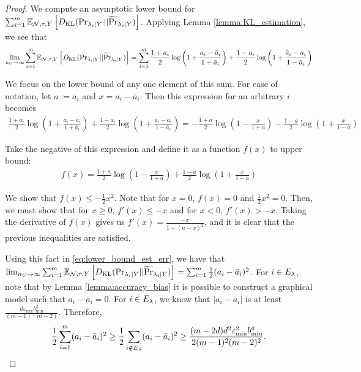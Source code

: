 \begin{proof}
We compute an asymptotic lower bound for $\sum_{i = 1}^m \mathbb{E}_{\mathcal{N}, \tau, Y}\left[D_{\mathrm{KL}}( \Pr_{\lambda_i | Y} || \widetilde{\Pr}_{\lambda_i | Y})\right]$. Applying Lemma \ref{lemma:KL_estimation}, we see that 
\begin{align}
    \lim_{n_U \rightarrow \infty} \sum_{i = 1}^m \mathbb{E}_{\mathcal{N}, \tau, Y}\left[D_{\mathrm{KL}}( \mathrm{Pr}_{\lambda_i | Y} || \widetilde{\Pr}_{\lambda_i | Y})\right] = \sum_{i = 1}^m \frac{1 + a_i}{2} \log \left(1 + \frac{a_i - \bar{a}_i}{1 + \bar{a}_i}\right) + \frac{1 - a_i}{2} \log \left(1 + \frac{\bar{a}_i - a_i}{1 - \bar{a}_i}\right) \label{eq:lower_bound_est_err}
\end{align}

We focus on the lower bound of any one element of this sum. For ease of notation, let $a := a_i$ and $x = a_i - \bar{a}_i$. Then this expression for an arbitrary $i$ becomes
\begin{align}
    \frac{1 + a_i}{2} \log \left(1 + \frac{a_i - \bar{a}_i}{1 + \bar{a}_i}\right) + \frac{1 - a_i}{2} \log \left(1 + \frac{\bar{a}_i - a_i}{1 - \bar{a}_i}\right) = - \frac{1 + a}{2} \log \left(1 - \frac{x}{1 + a}\right) - \frac{1 - a}{2} \log \left(1 + \frac{x}{1 - a}\right) 
\end{align}

Take the negative of this expression and define it as a function $f(x)$ to upper bound:
\begin{align}
    f(x) = \frac{1 + a}{2} \log \left(1 - \frac{x}{1 + a}\right) + \frac{1 - a}{2} \log \left(1 + \frac{x}{1 - a}\right)
\end{align}

We show that $f(x) \le - \frac{1}{2}x^2$. Note that for $x = 0$, $f(x) = 0$ and $\frac{1}{2}x^2 = 0$. Then, we must show that for $x \ge 0$, $f'(x) \le -x$ and for $x < 0$, $f'(x) > -x$. Taking the derivative of $f(x)$ gives us $f'(x) = \frac{-x}{1 - (a - x)^2}$, and it is clear that the previous inequalities are satisfied.

Using this fact in \eqref{eq:lower_bound_est_err}, we have that $
     \lim_{n_U \rightarrow \infty} \sum_{i = 1}^m \mathbb{E}_{\mathcal{N}, \tau, Y}\left[D_{\mathrm{KL}}( \mathrm{Pr}_{\lambda_i | Y} || \widetilde{\Pr}_{\lambda_i | Y})\right] = \sum_{i = 1}^m \frac{1}{2} (a_i - \bar{a}_i)^2
$. For $i \in E_{\lambda}$, note that by Lemma \ref{lemma:accuracy_bias} it is possible to construct a graphical model such that $a_i - \bar{a}_i = 0$. For $i \in E_{\lambda}$, we know that $|a_i - \bar{a}_i|$ is at least $\frac{d \varepsilon_{\min} b_{\min}^2}{(m - 1)(m - 2)}$. Therefore,
\begin{align}
    \frac{1}{2} \sum_{i = 1}^m (a_i - \bar{a}_i)^2 \ge \frac{1}{2} \sum_{i \notin E_{\lambda}} (a_i - \bar{a}_i)^2 \ge \frac{(m - 2d) d^2 \varepsilon_{\min}^2 b_{\min}^4}{2(m-1)^2 (m-2)^2}.
\end{align}
\end{proof}


